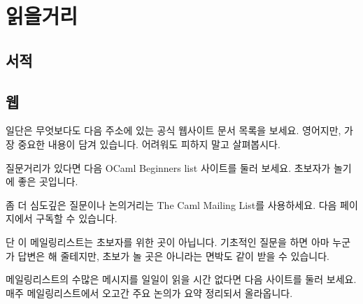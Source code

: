 \section{읽을거리}\label{sec:ref}

\subsection{서적}


\subsection{웹}

일단은 무엇보다도 다음 주소에 있는 \OCAML{} 공식 웹사이트 문서 목록을
보세요. 영어지만, 가장 중요한 내용이 담겨 있습니다. 어려워도 피하지 말고
살펴봅시다.

\begin{center}
\end{center}

질문거리가 있다면 다음 \textsf{OCaml Beginners list} 사이트를 둘러 보세요.
초보자가 놀기에 좋은 곳입니다.

\begin{center}
\end{center}

좀 더 심도깊은 질문이나 논의거리는 \textsf{The Caml Mailing List}를
사용하세요. 다음 페이지에서 구독할 수 있습니다.

\begin{center}
\end{center}

단 이 메일링리스트는 초보자를 위한 곳이 아닙니다. 기초적인 질문을 하면
아마 누군가 답변은 해 줄테지만, 초보가 놀 곳은 아니라는 면박도 같이 받을 수
있습니다.

메일링리스트의 수많은 메시지를 일일이 읽을 시간 없다면 다음 사이트를 둘러
보세요. 매주 메일링리스트에서 오고간 주요 논의가 요약 정리되서 올라옵니다.

\begin{center}
\end{center}



